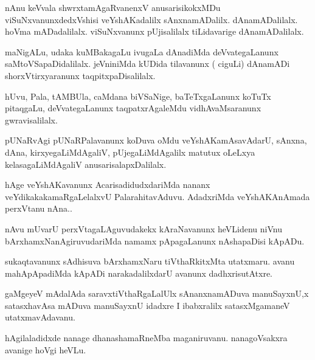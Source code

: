 \documentclass{article}
\begin{document}
\begin{mn}%
nAnu keVvala shwrxtamAgaRvanenxV anusarisikokxMDu viSuNxvanunxdedxVshisi veYshAKadalilx 
sAnxnamADalilx. dAnamADalilalx. hoVma mADadalilalx. viSuNxvanunx pUjisalilalx 
tiLidavarige dAnamADalilalx.
\end{mn}

\begin{mn}%
maNigALu, udaka kuMBakagaLu ivugaLa dAnadiMda deVvategaLanunx saMtoVSapaDidalilalx. 
jeVniniMda kUDida tilavanunx ( ciguLi) dAnamADi shorxVtirxyaranunx taqpitxpaDisalilalx.
\end{mn}

\begin{mn}%
hUvu, Pala, tAMBUla, caMdana biVSaNige, baTeTxgaLanunx koTuTx pitaqgaLu, deVvategaLanunx 
taqpatxrAgaleMdu vidhAvaMsaranunx gwravisalilalx.
\end{mn}

\begin{mn}%
pUNaRvAgi pUNaRPalavanunx koDuva oMdu veYshAKamAsavAdarU, sAnxna, dAna, 
kirxyegaLiMdAgaliV, pUjegaLiMdAgalilx matutux oLeLxya kelasagaLiMdAgaliV 
anusarisalapxDalilalx.
\end{mn}

\begin{mn}%
hAge veYshAKavanunx AcarisadidudxdariMda nananx veYdikakakamaRgaLelalxvU PalarahitavAduvu. 
AdadxriMda veYshAKAnAmada perxVtanu nAna..
\end{mn}

\begin{mn}%
nAvu mUvarU perxVtagaLAguvudakekx kAraNavanunx heVLidenu  niVnu bArxhamxNanAgiruvudariMda 
namamx pApagaLanunx nAshapaDisi kApADu.
\end{mn}

\begin{mn}%
sukaqtavanunx sAdhisuva bArxhamxNaru tiVthaRkitxMta utatxmaru. avanu mahApApadiMda kApADi 
narakadalilxdarU avanunx dadhxrisutAtxre.
\end{mn}

\begin{mn}%
gaMgeyeV mAdalAda saravxtiVthaRgaLalUlx sAnanxnamADuva manuSayxnU,x satasxhavAsa mADuva 
manuSayxnU idadxre I ibabxralilx satasxMgamaneV utatxmavAdavanu.
\end{mn}

\begin{mn}%
hAgilaladidxde nanage dhanashamaRneMba maganiruvanu. nanagoVsakxra avanige hoVgi heVLu.
\end{mn}
\end{document}

